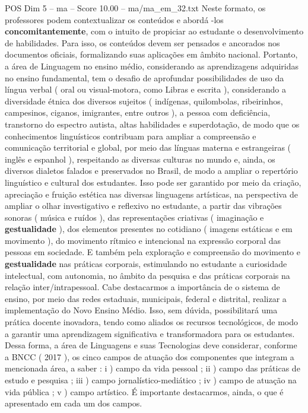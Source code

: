 \begin{textsample}{POS Dim 5 – ma – Score 10.00 – ma/ma\_em\_32.txt}
Neste formato, os professores podem contextualizar os conteúdos e abordá -los \textbf{concomitantemente}, com o intuito de propiciar ao estudante o desenvolvimento de habilidades.
Para isso, os conteúdos devem ser pensados e ancorados nos documentos oficiais, formalizando suas aplicações em âmbito nacional.
Portanto, a área de Linguagem no ensino médio, considerando as aprendizagens adquiridas no ensino fundamental, tem o desafio de aprofundar possibilidades de uso da língua verbal ( oral ou visual-motora, como Libras e escrita ), considerando a diversidade étnica dos diversos sujeitos ( indígenas, quilombolas, ribeirinhos, campesinos, ciganos, imigrantes, entre outros ), a pessoa com deficiência, transtorno do espectro autista, altas habilidades e superdotação, de modo que os conhecimentos linguísticos contribuam para ampliar a compreensão e comunicação territorial e global, por meio das línguas materna e estrangeiras ( inglês e espanhol ), respeitando as diversas culturas no mundo e, ainda, os diversos dialetos falados e preservados no Brasil, de modo a ampliar o repertório linguístico e cultural dos estudantes.
Isso pode ser garantido por meio da criação, apreciação e fruição estética nas diversas linguagens artísticas, na perspectiva de ampliar o olhar investigativo e reflexivo no estudante, a partir das vibrações sonoras ( música e ruídos ), das representações criativas ( imaginação e \textbf{gestualidade} ), dos elementos presentes no cotidiano ( imagens estáticas e em movimento ), do movimento rítmico e intencional na expressão corporal das pessoas em sociedade.
E também pela exploração e compreensão do movimento e \textbf{gestualidade} nas práticas corporais, estimulando no estudante a curiosidade intelectual, com autonomia, no âmbito da pesquisa e das práticas corporais na relação inter/intrapessoal.
Cabe destacarmos a importância de o sistema de ensino, por meio das redes estaduais, municipais, federal e distrital, realizar a implementação do Novo Ensino Médio.
Isso, sem dúvida, possibilitará uma prática docente inovadora, tendo como aliados os recursos tecnológicos, de modo a garantir uma aprendizagem significativa e transformadora para os estudantes.
Dessa forma, a área de Linguagens e suas Tecnologias deve considerar, conforme a BNCC ( 2017 ), os cinco campos de atuação dos componentes que integram a mencionada área, a saber : i ) campo da vida pessoal ; ii ) campo das práticas de estudo e pesquisa ; iii ) campo jornalístico-mediático ; iv ) campo de atuação na vida pública ; v ) campo artístico.
É importante destacarmos, ainda, o que é apresentado em cada um dos campos.

\end{textsample}
